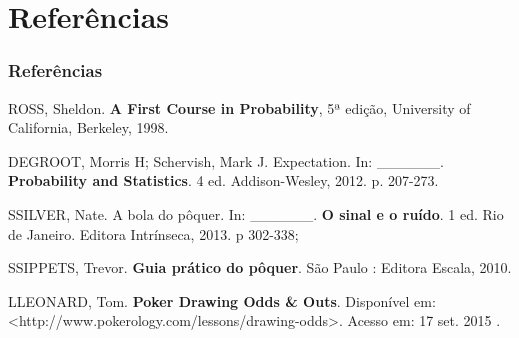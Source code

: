 \documentclass{beamer}
\begin{document}
\section{Referências}
\begin{frame}
\frametitle{Referências} 
	\begin{thebibliography}{5}
		\nocite{*}
		 ROSS, Sheldon. \textbf{A First Course in Probability}, 5ª edição, University of California, Berkeley, 1998.
		
		 DEGROOT, Morris H; Schervish, Mark J. Expectation. In: \_\_\_\_\_\_. \textbf{Probability and Statistics}. 4 ed. Addison-Wesley, 2012. p. 207-273.
		
		\bibitem[silver] SSILVER, Nate. A bola do pôquer. In: \_\_\_\_\_\_. \textbf{O sinal e o ruído}. 1 ed. Rio de Janeiro. Editora Intrínseca, 2013. p 302-338;

		\bibitem[trevor] SSIPPETS, Trevor. \textbf{Guia prático do pôquer}. São Paulo : Editora Escala, 2010.
		
		\bibitem[adiga] LLEONARD, Tom. \textbf{Poker Drawing Odds \& Outs}. Disponível em: <http://www.pokerology.com/lessons/drawing-odds>. Acesso em: 17 set. 2015 .	
	\end{thebibliography}
\end{frame}
\end{document}
